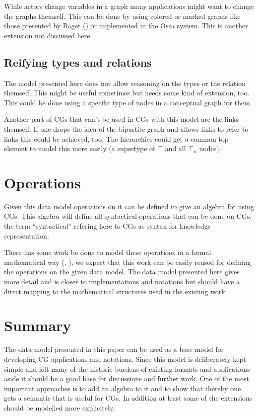 \documentclass{article}
\begin{document}
While actors change variables in a graph many applications might want
to change the graphs themself. This can be done by using colored or
marked graphs like those presented by Baget (\cite{Ba00}) or implemented in
the Ossa system. This is another extension not discussed here.

\subsection{Reifying types and relations}

The model presented here does not allow reasoning on the types or the
relation themself. This might be useful sometimes but needs some kind
of extension, too. This could be done using a specific type of nodes
in a conceptual graph for them.

Another part of CGs that can't be used in CGs with this model are the
links themself. If one drops the idea of the bipartite graph and
allows links to refer to links this could be achieved, too. The
hierarchies could get a common top element to model this more easily
(a supertype of $\top$ and all $\top_n$ nodes).

\section{Operations}

Given this data model operations on it can be defined to give an
algebra for using CGs. This algebra will define all syntactical
operations that can be done on CGs, the term ``syntactical'' refering
here to CGs as syntax for knowledge representation.

There has some work be done to model these operations in a formal
mathematical way (\cite{Pr00}, \cite{Mi00}), we expect that this work
can be easily reused for defining the operations on the given data
model.  The data model presented here gives more detail and is closer
to implementations and notations but should have a direct mapping to
the mathematical structures used in the existing work.

\section{Summary}
\label{sec:summary}

The data model presented in this paper can be used as a base model for
developing CG applications and notations. Since this model is
deliberately kept simple and left many of the historic burdens of
existing formats and applications aside it should be a good base for
discussions and further work. One of the most important approaches is
to add an algebra to it and to show that thereby one gets a semantic
that is useful for CGs. In addition at least some of the extensions
should be modelled more explicitely.
\end{document}
